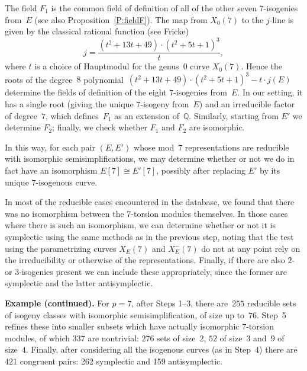 \documentclass[12pt]{amsart}
\newcommand{\F}{\mathbb{F}}
\newcommand{\Q}{\mathbb{Q}}
\numberwithin{equation}{section}
\theoremstyle{definition}
\theoremstyle{remark}
\begin{document}

The field $F_1$ is the common field of definition of all of the other
seven $7$-isogenies from~$E$ (see also Proposition~\ref{P:fieldF}).
The map from $X_0(7)$ to the $j$-line is given by the classical
rational function (see Fricke)
\[
   j = \frac{(t^{2} + 13t + 49) \cdot (t^{2} + 5t + 1)^{3}}{t},
\]
where $t$ is a choice of Hauptmodul for the genus~$0$ curve
$X_0(7)$. Hence the roots of the degree~$8$ polynomial~$(t^{2} + 13t +
49) \cdot (t^{2} + 5t + 1)^{3} -t\cdot j(E)$ determine the fields of
definition of the eight $7$-isogenies from~$E$. In our setting, it has
a single root (giving the unique $7$-isogeny from~$E$) and an
irreducible factor of degree~$7$, which defines~$F_1$ as an extension
of~$\Q$. Similarly, starting from $E'$ we determine $F_2$; finally, we
check whether $F_1$ and $F_2$ are isomorphic.


In this way, for each pair $(E,E')$ whose 
mod~$7$ representations
are reducible with isomorphic semisimplifications, we may determine
whether or not we do in fact have an isomorphism $E[7]\cong E'[7]$,
possibly after replacing $E'$ by its unique $7$-isogenous curve.

In most of the reducible cases encountered in the database, we found
that there was no isomorphism between the $7$-torsion modules
themselves.  In those cases where there is such an isomorphism, we can
determine whether or not it is symplectic using the same methods as in
the previous step, noting that the test using the parametrizing curves
$X_E(7)$ and $X_E^-(7)$ do not at any point rely on the irreducibility
or otherwise of the representations.  Finally, if there are also
$2$-{} or $3$-isogenies present we can include these appropriately,
since the former are symplectic and the latter antisymplectic.

{\bf Example (continued).} For $p=7$, after Steps 1--3, there
are~$255$ reducible sets of isogeny classes with isomorphic
semisimplification, of size up to~$76$.  Step~5 refines these into
smaller subsets which have actually isomorphic $7$-torsion modules, of
which $337$ are nontrivial: $276$ sets of size~$2$, $52$ of size~$3$
and~$9$ of size~$4$.  Finally, after considering all the isogenous
curves (as in Step~4) there are 421 congruent pairs: 262 symplectic
and 159 antisymplectic.
\end{document}
